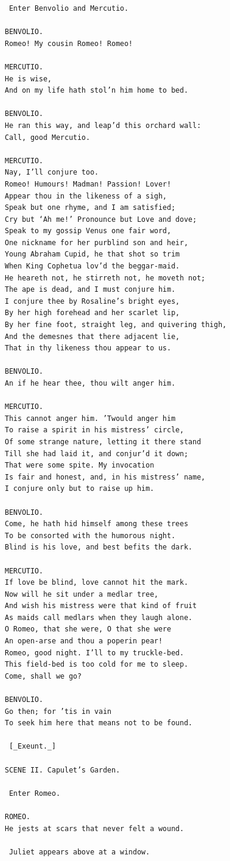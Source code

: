 \documentclass{article}
\begin{document}
\begin{verbatim}
 Enter Benvolio and Mercutio.

BENVOLIO.
Romeo! My cousin Romeo! Romeo!

MERCUTIO.
He is wise,
And on my life hath stol’n him home to bed.

BENVOLIO.
He ran this way, and leap’d this orchard wall:
Call, good Mercutio.

MERCUTIO.
Nay, I’ll conjure too.
Romeo! Humours! Madman! Passion! Lover!
Appear thou in the likeness of a sigh,
Speak but one rhyme, and I am satisfied;
Cry but ‘Ah me!’ Pronounce but Love and dove;
Speak to my gossip Venus one fair word,
One nickname for her purblind son and heir,
Young Abraham Cupid, he that shot so trim
When King Cophetua lov’d the beggar-maid.
He heareth not, he stirreth not, he moveth not;
The ape is dead, and I must conjure him.
I conjure thee by Rosaline’s bright eyes,
By her high forehead and her scarlet lip,
By her fine foot, straight leg, and quivering thigh,
And the demesnes that there adjacent lie,
That in thy likeness thou appear to us.

BENVOLIO.
An if he hear thee, thou wilt anger him.

MERCUTIO.
This cannot anger him. ’Twould anger him
To raise a spirit in his mistress’ circle,
Of some strange nature, letting it there stand
Till she had laid it, and conjur’d it down;
That were some spite. My invocation
Is fair and honest, and, in his mistress’ name,
I conjure only but to raise up him.

BENVOLIO.
Come, he hath hid himself among these trees
To be consorted with the humorous night.
Blind is his love, and best befits the dark.

MERCUTIO.
If love be blind, love cannot hit the mark.
Now will he sit under a medlar tree,
And wish his mistress were that kind of fruit
As maids call medlars when they laugh alone.
O Romeo, that she were, O that she were
An open-arse and thou a poperin pear!
Romeo, good night. I’ll to my truckle-bed.
This field-bed is too cold for me to sleep.
Come, shall we go?

BENVOLIO.
Go then; for ’tis in vain
To seek him here that means not to be found.

 [_Exeunt._]

SCENE II. Capulet’s Garden.

 Enter Romeo.

ROMEO.
He jests at scars that never felt a wound.

 Juliet appears above at a window.


\end{verbatim}
\end{document}
